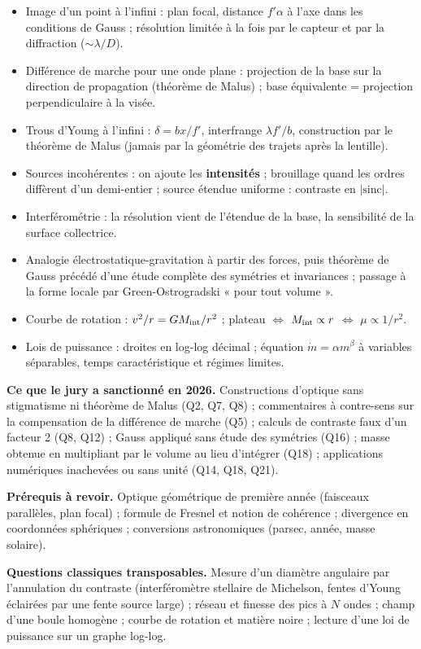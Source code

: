 \documentclass[11pt,a4paper]{article}
\providecommand{\tightlist}{\setlength{\itemsep}{0pt}\setlength{\parskip}{0pt}}
\begin{document}
\begin{itemize}
\tightlist
\item
  Image d'un point à l'infini : plan focal, distance \(f'\alpha\) à l'axe dans les conditions de Gauss ; résolution limitée à la fois par le capteur et par la diffraction (\(\sim\lambda/D\)).
\item
  Différence de marche pour une onde plane : projection de la base sur la direction de propagation (théorème de Malus) ; base équivalente = projection perpendiculaire à la visée.
\item
  Trous d'Young à l'infini : \(\delta=bx/f'\), interfrange \(\lambda f'/b\), construction par le théorème de Malus (jamais par la géométrie des trajets après la lentille).
\item
  Sources incohérentes : on ajoute les \textbf{intensités} ; brouillage quand les ordres diffèrent d'un demi-entier ; source étendue uniforme : contraste en \(|\mathrm{sinc}|\).
\item
  Interférométrie : la résolution vient de l'étendue de la base, la sensibilité de la surface collectrice.
\item
  Analogie électrostatique-\allowbreak{}gravitation à partir des forces, puis théorème de Gauss précédé d'une étude complète des symétries et invariances ; passage à la forme locale par Green-Ostrogradski « pour tout volume ».
\item
  Courbe de rotation : \(v^2/r=GM_{\rm int}/r^2\) ; plateau \(\Leftrightarrow\) \(M_{\rm int}\propto r\) \(\Leftrightarrow\) \(\mu\propto1/r^2\).
\item
  Lois de puissance : droites en log-log décimal ; équation \(\dot m=\alpha m^\beta\) à variables séparables, temps caractéristique et régimes limites.
\end{itemize}

\textbf{Ce que le jury a sanctionné en 2026.} Constructions d'optique sans stigmatisme ni théorème de Malus (Q2, Q7, Q8) ; commentaires à contre-sens sur la compensation de la différence de marche (Q5) ; calculs de contraste faux d'un facteur 2 (Q8, Q12) ; Gauss appliqué sans étude des symétries (Q16) ; masse obtenue en multipliant par le volume au lieu d'intégrer (Q18) ; applications numériques inachevées ou sans unité (Q14, Q18, Q21).

\textbf{Prérequis à revoir.} Optique géométrique de première année (faisceaux parallèles, plan focal) ; formule de Fresnel et notion de cohérence ; divergence en coordonnées sphériques ; conversions astronomiques (parsec, année, masse solaire).

\textbf{Questions classiques transposables.} Mesure d'un diamètre angulaire par l'annulation du contraste (interféromètre stellaire de Michelson, fentes d'Young éclairées par une fente source large) ; réseau et finesse des pics à \(N\) ondes ; champ d'une boule homogène ; courbe de rotation et matière noire ; lecture d'une loi de puissance sur un graphe log-log.
\end{document}
